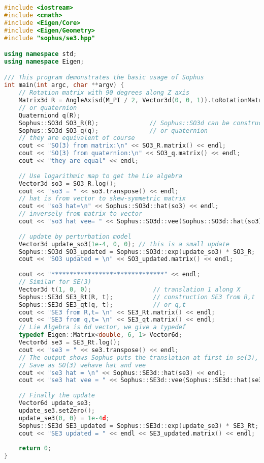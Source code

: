 \begin{lstlisting}[language=c++,caption=slambook/ch4/useSophus.cpp]
#include <iostream>
#include <cmath>
#include <Eigen/Core>
#include <Eigen/Geometry>
#include "sophus/se3.hpp"

using namespace std;
using namespace Eigen;

/// This program demonstrates the basic usage of Sophus
int main(int argc, char **argv) {
    // Rotation matrix with 90 degrees along Z axis
    Matrix3d R = AngleAxisd(M_PI / 2, Vector3d(0, 0, 1)).toRotationMatrix();
    // or quaternion
    Quaterniond q(R);
    Sophus::SO3d SO3_R(R);              // Sophus::SO3d can be constructed from rotation matrix
    Sophus::SO3d SO3_q(q);              // or quaternion
    // they are equivalent of course
    cout << "SO(3) from matrix:\n" << SO3_R.matrix() << endl;
    cout << "SO(3) from quaternion:\n" << SO3_q.matrix() << endl;
    cout << "they are equal" << endl;
    
    // Use logarithmic map to get the Lie algebra
    Vector3d so3 = SO3_R.log();
    cout << "so3 = " << so3.transpose() << endl;
    // hat is from vector to skew-symmetric matrix
    cout << "so3 hat=\n" << Sophus::SO3d::hat(so3) << endl;
    // inversely from matrix to vector
    cout << "so3 hat vee= " << Sophus::SO3d::vee(Sophus::SO3d::hat(so3)).transpose() << endl;
    
    // update by perturbation model
    Vector3d update_so3(1e-4, 0, 0); // this is a small update
    Sophus::SO3d SO3_updated = Sophus::SO3d::exp(update_so3) * SO3_R;
    cout << "SO3 updated = \n" << SO3_updated.matrix() << endl;
    
    cout << "*******************************" << endl;
    // Similar for SE(3)
    Vector3d t(1, 0, 0);                 // translation 1 along X
    Sophus::SE3d SE3_Rt(R, t);           // construction SE3 from R,t
    Sophus::SE3d SE3_qt(q, t);           // or q,t
    cout << "SE3 from R,t= \n" << SE3_Rt.matrix() << endl;
    cout << "SE3 from q,t= \n" << SE3_qt.matrix() << endl;
    // Lie Algebra is 6d vector, we give a typedef
    typedef Eigen::Matrix<double, 6, 1> Vector6d;
    Vector6d se3 = SE3_Rt.log();
    cout << "se3 = " << se3.transpose() << endl;
    // The output shows Sophus puts the translation at first in se(3), then rotation.
    // Save as SO(3) wehave hat and vee
    cout << "se3 hat = \n" << Sophus::SE3d::hat(se3) << endl;
    cout << "se3 hat vee = " << Sophus::SE3d::vee(Sophus::SE3d::hat(se3)).transpose() << endl;
    
    // Finally the update
    Vector6d update_se3; 
    update_se3.setZero();
    update_se3(0, 0) = 1e-4d;
    Sophus::SE3d SE3_updated = Sophus::SE3d::exp(update_se3) * SE3_Rt;
    cout << "SE3 updated = " << endl << SE3_updated.matrix() << endl;
    
    return 0;
}
\end{lstlisting}


